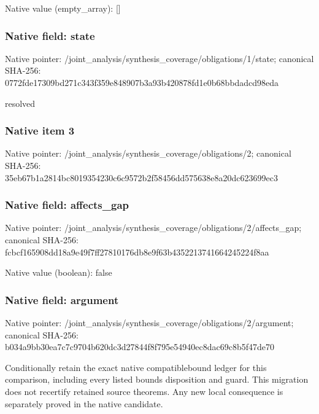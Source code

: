 \documentclass[10pt,a4paper]{article}
\begin{document}
Native value (empty\_array): []



\subsubsection{Native field: state}


Native pointer: /joint\_analysis/synthesi\allowbreak{}s\_coverage/obligations/1\allowbreak{}/state; canonical SHA-256: 0772fde17309bd271c343f35\allowbreak{}9e848907b3a93b420878fd1e\allowbreak{}0b68bbdadcd98eda


resolved


\subsubsection{Native item 3}


Native pointer: /joint\_analysis/synthesi\allowbreak{}s\_coverage/obligations/2; canonical SHA-256: 35eb67b1a2814bc801935423\allowbreak{}0c6c9572b2f58456dd575638\allowbreak{}e8a20dc623699ec3



\subsubsection{Native field: affects\_gap}


Native pointer: /joint\_analysis/synthesi\allowbreak{}s\_coverage/obligations/2\allowbreak{}/affects\_gap; canonical SHA-256: fcbcf165908dd18a9e49f7ff\allowbreak{}27810176db8e9f63b4352213\allowbreak{}741664245224f8aa



Native value (boolean): false



\subsubsection{Native field: argument}


Native pointer: /joint\_analysis/synthesi\allowbreak{}s\_coverage/obligations/2\allowbreak{}/argument; canonical SHA-256: b034a9bb30ea7c7c9704b620\allowbreak{}dc3d27844f8f795e54940ec8\allowbreak{}dac69c8b5f47de70


Conditionally retain the exact native compatiblebound ledger for this comparison, including every listed bounds disposition and guard. This migration does not recertify retained source theorems. Any new local consequence is separately proved in the native candidate.
\end{document}
